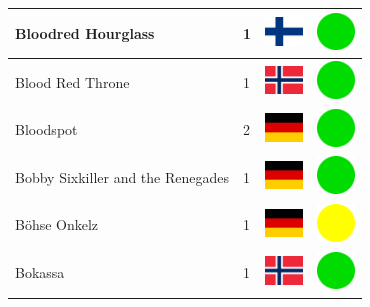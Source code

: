 \documentclass[12pt, a4paper, twoside]{report}
\begin{document}
\begin{center}
\begin{longtable}{|p{5cm}|p{2cm}|p{2cm}|p{2cm}|}
			Bloodred Hourglass & 1 & \includegraphics[width=1cm]{4x3/fi} & \includegraphics[width=1cm]{likes/y} \\ \hline
			Blood Red Throne & 1 & \includegraphics[width=1cm]{4x3/no} & \includegraphics[width=1cm]{likes/y} \\ \hline
			Bloodspot & 2 & \includegraphics[width=1cm]{4x3/de} & \includegraphics[width=1cm]{likes/y} \\ \hline
			Bobby Sixkiller and the Renegades & 1 & \includegraphics[width=1cm]{4x3/de} & \includegraphics[width=1cm]{likes/y} \\ \hline
			Böhse Onkelz & 1 & \includegraphics[width=1cm]{4x3/de} & \includegraphics[width=1cm]{likes/m} \\ \hline
			Bokassa & 1 & \includegraphics[width=1cm]{4x3/no} & \includegraphics[width=1cm]{likes/y} \\ \hline

\end{longtable}
\end{center}
\end{document}

